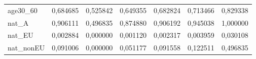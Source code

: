 \begin{table}
\begin{tabular}{lrrrrrr}
age30\_60        &      0,684685 &      0,525842 &      0,649355 &      0,682824 &      0,713466 &      0,829338 \\
nat\_A           &      0,906111 &      0,496835 &      0,874880 &      0,906192 &      0,945038 &      1,000000 \\
nat\_EU          &      0,002884 &      0,000000 &      0,001120 &      0,002317 &      0,003959 &      0,030108 \\
nat\_nonEU       &      0,091006 &      0,000000 &      0,051177 &      0,091558 &      0,122511 &      0,496835 \\
\bottomrule
\end{tabular}
\end{table}
